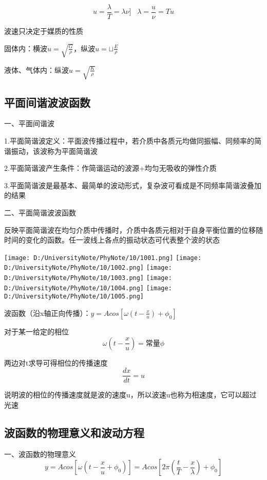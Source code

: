 \documentclass[UTF8]{article}
\begin{document}
    \[u = \frac{\lambda}{T} = \lambda\nu]\;\;\;\lambda = \frac{u}{\nu} = Tu\]

    波速只决定于媒质的性质

    固体内：横波\;$u = \sqrt{\frac{G}{\rho}}$，纵波\;$u = \sqcup\frac{E}{\rho}$

    液体、气体内：纵波\;$u = \sqrt{\frac{K}{\rho}}$

\subsection{平面间谐波波函数}

    一、平面间谐波

    1.平面简谐波定义：平面波传播过程中，若介质中各质元均做同振幅、同频率的简谐振动，该波称为平面简谐波

    2.平面简谐波产生条件：作简谐运动的波源\;+\;均匀无吸收的弹性介质

    3.平面简谐波是最基本、最简单的波动形式，复杂波可看成是不同频率简谐波叠加的结果

    二、平面简谐波波函数

    反映平面简谐波在均匀介质中传播时，介质中各质元相对于自身平衡位置的位移随时间的变化的函数。任一波线上各点的振动状态可代表整个波的状态

    \texttt{[image: D:/UniversityNote/PhyNote/10/1001.png]}
    \texttt{[image: D:/UniversityNote/PhyNote/10/1002.png]}
    \texttt{[image: D:/UniversityNote/PhyNote/10/1003.png]}
    \texttt{[image: D:/UniversityNote/PhyNote/10/1004.png]}
    \texttt{[image: D:/UniversityNote/PhyNote/10/1005.png]}

    波函数（沿x轴正向传播）：$y = Acos[\omega(t - \frac{x}{u}) + \phi_0]$

    对于某一给定的相位
    \[\omega (t - \frac{x}{u}) = \mbox{常量}\phi\]

    两边对t求导可得相位的传播速度
    \[\frac{dx}{dt} = u\]

    说明波的相位的传播速度就是波的速度u，所以波速u也称为相速度，它可以超过光速

\subsection{波函数的物理意义和波动方程}

    一、波函数的物理意义
    \[y = Acos[\omega(t - \frac{x}{u} + \phi_0)] = Acos[2\pi(\frac{t}{T} - \frac{x}{\lambda}) + \phi_0]\]
\end{document}
